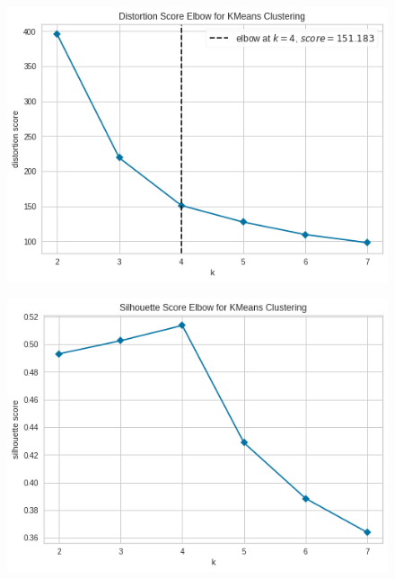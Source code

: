 \begin{figure}[!htb]
	\centering
	\begin{minipage}{.32\textwidth}
		\centering
		\includegraphics[width=\linewidth]{plots/kmeans/kmeans_elbow_rule}
		\label{fig:kmeans_elbow_rule}
	\end{minipage}%
	\begin{minipage}{.32\textwidth}
		\centering
		\includegraphics[width=\linewidth]{plots/kmeans/kmeans_silhouette_score}
		\label{fig:kmeans_silhouette_score}
	\end{minipage}
	\begin{minipage}{.32\textwidth}
		\centering

\end{minipage}
\end{figure}
